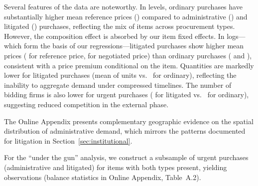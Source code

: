 Several features of the data are noteworthy. In levels, ordinary purchases have substantially higher mean reference prices (\BPmeanRefPriceOrd) compared to administrative (\BPmeanRefPriceAdm) and litigated (\BPmeanRefPriceLit) purchases, reflecting the mix of items across procurement types. However, the composition effect is absorbed by our item fixed effects. In logs---which form the basis of our regressions---litigated purchases show higher mean prices (\BPmeanLogRefLit{} for reference price, \BPmeanLogNegLit{} for negotiated price) than ordinary purchases (\BPmeanLogRefOrd{} and \BPmeanLogNegOrd), consistent with a price premium conditional on the item. Quantities are markedly lower for litigated purchases (mean of \BPmeanQtyLit{} units vs.\ \BPmeanQtyOrd{} for ordinary), reflecting the inability to aggregate demand under compressed timelines. The number of bidding firms is also lower for urgent purchases (\BPmeanFirmsLit{} for litigated vs.\ \BPmeanFirmsOrd{} for ordinary), suggesting reduced competition in the external phase.

The Online Appendix presents complementary geographic evidence on the spatial distribution of administrative demand, which mirrors the patterns documented for litigation in Section~\ref{sec:institutional}.

For the ``under the gun'' analysis, we construct a subsample of urgent purchases (administrative and litigated) for items with both types present, yielding \BPnUTG{} observations (balance statistics in Online Appendix, Table~A.2).

